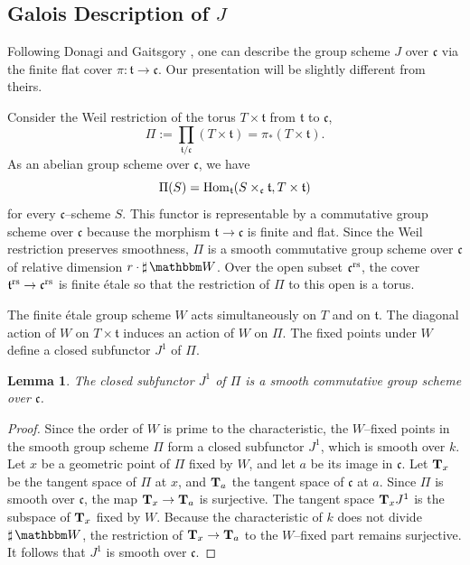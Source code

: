 \documentclass[12pt,english]{smfart}
\numberwithin{equation}{subsection}
\newtheorem{lemma}[equation]{Lemma}
\theoremstyle{remark}
\newcommand\bbW{{\mathbbm W}}
\newcommand\Hom{{\rm Hom}}
\newcommand\rs{{\rm rs}}
\begin{document}
\subsection{Galois Description of $J$}
\label{desciption galoisienne de J}

Following Donagi and Gaitsgory \cite{DG}, one can describe the group scheme $J$ over $\mathfrak{c}$ via the finite flat cover $\pi:\mathfrak{t}\to\mathfrak{c}$. Our presentation will be slightly different from theirs.

Consider the Weil restriction of the torus $T\times\mathfrak{t}$ from $\mathfrak{t}$ to $\mathfrak{c}$,
$$\Pi:=\prod_{\mathfrak{t}/\mathfrak{c}} (T\times\mathfrak{t})=\pi_*(T\times\mathfrak{t}).$$
As an abelian group scheme over $\mathfrak{c}$, we have
$$
\Pi(S)=\Hom_\mathfrak{t}(S\times_\mathfrak{c}\mathfrak{t},T\times\mathfrak{t})
$$
for every $\mathfrak{c}$--scheme $S$. This functor is representable by a commutative group scheme over $\mathfrak{c}$ because the morphism $\mathfrak{t}\to\mathfrak{c}$ is finite and flat. Since the Weil restriction preserves smoothness, $\Pi$ is a smooth commutative group scheme over $\mathfrak{c}$ of relative dimension $r\cdot\sharp\,\bbW$. Over the open subset $\mathfrak{c}^\rs$, the cover $\mathfrak{t}^\rs\to\mathfrak{c}^\rs$ is finite \'etale so that the restriction of $\Pi$ to this open is a torus.

The finite \'etale group scheme $W$ acts simultaneously on $T$ and on $\mathfrak{t}$. The diagonal action of $W$ on $T\times\mathfrak{t}$ induces an action of $W$ on $\Pi$. The fixed points under $W$ define a closed subfunctor $J^1$ of $\Pi$.

\begin{lemma}\label{J1}
The closed subfunctor $J^1$ of $\Pi$ is a smooth commutative group scheme over $\mathfrak{c}$.
\end{lemma}

\begin{proof}
Since the order of $W$ is prime to the characteristic, the $W$--fixed points in the smooth group scheme $\Pi$ form a closed subfunctor $J^1$, which is smooth over $k$. Let $x$ be a geometric point of $\Pi$ fixed by $W$, and let $a$ be its image in $\mathfrak{c}$. Let ${\bf T}_x$ be the tangent space of $\Pi$ at $x$, and ${\bf T}_a$ the tangent space of $\mathfrak{c}$ at $a$. Since $\Pi$ is smooth over $\mathfrak{c}$, the map ${\bf T}_x\to {\bf T}_a$ is surjective. The tangent space ${\bf T}_x J^1$ is the subspace of ${\bf T}_x$ fixed by $W$. Because the characteristic of $k$ does not divide $\sharp\,\bbW$, the restriction of ${\bf T}_x\to {\bf T}_a$ to the $W$--fixed part remains surjective. It follows that $J^1$ is smooth over $\mathfrak{c}$.
\end{proof}
\end{document}
